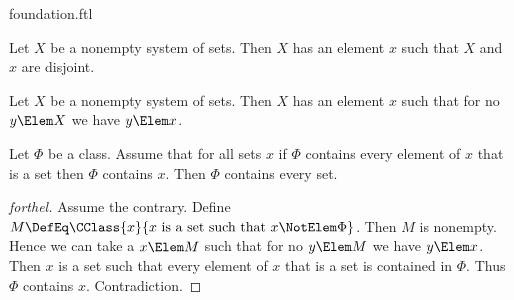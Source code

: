 \documentclass{stex}
\begin{document}
\begin{smodule}{foundation.ftl}


\begin{axiom}[forthel,title=Foundation,name=Foundation Axiom]
  Let $X$ be a nonempty system of sets.
  Then $X$ has an element $x$ such that $X$ and $x$ are disjoint.
\end{axiom}

\begin{corollary}[forthel,name=wellfoundedness of membership relation]
  Let $X$ be a nonempty system of sets.
  Then $X$ has an element $x$ such that for no $y \Elem X$ we have $y \Elem x$.
\end{corollary}

\begin{proposition}[forthel,name=epsilon induction]
  Let $\Phi$ be a class.
  Assume that for all sets $x$ if $\Phi$ contains every element of $x$ that is a set then $\Phi$ contains $x$.
  Then $\Phi$ contains every set.
\end{proposition}
\begin{proof}[forthel]
  Assume the contrary.
  Define $M \DefEq \CClass{x}{x\text{ is a set such that }x \NotElem \Phi}$.
  Then $M$ is nonempty.
  Hence we can take a $x \Elem M$ such that for no $y \Elem M$ we have $y \Elem x$.
  Then $x$ is a set such that every element of $x$ that is a set is contained in $\Phi$.
  Thus $\Phi$ contains $x$.
  Contradiction.
\end{proof}
\end{smodule}
\end{document}
